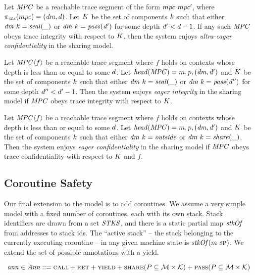 \documentclass[acmsmall,review,anonymous]{acmart}\settopmatter{printfolios=true,printccs=false,printacmref=false}
\begin{document}
 Let \(\mathit{MPC}\) be a reachable trace segment of the form
\(mpc ~ mpc'\), where \(\pi_{\mathit{ctx}}(mpc) = (\mathit{dm},d)\).
Let \(K\) be the set of components \(k\) such that either
\(\mathit{dm} ~ k = \mathit{seal(\_)}\) or \(\mathit{dm} ~ k = \mathit{pass(d')}\) for
some depth \(d' < d-1\). If any such \(\mathit{MPC}\) obeys trace integrity with respect
to \(K\), then the system enjoys {\em ultra-eager confidentiality} in the sharing
model.

 Let \(\mathit{MPC} \langle f \rangle\) be a reachable trace segment where \(f\) holds
on contexts whose depth is less than or equal to some \(d\). Let \(\mathit{head}(\mathit{MPC}) =
m,p,(\mathit{dm},d')\) and \(K\) be the set of components
\(k\) such that either \(\mathit{dm} ~ k = \mathit{seal(\_)}\) or
\(\mathit{dm} ~ k = \mathit{pass(d'')}\) for some depth \(d'' < d'-1\).
Then the system enjoys {\em eager integrity} in the sharing model if \(\mathit{MPC}\) obeys
trace integrity with respect to \(K\).

 Let \(\mathit{MPC} \langle f \rangle\) be a reachable trace segment where \(f\) holds
on contexts whose depth is less than or equal to some \(d\). Let \(\mathit{head}(\mathit{MPC}) =
m,p,(\mathit{dm},d')\) and \(K\) be the set of components
\(k\) such that either \(\mathit{dm} ~ k = \mathit{outside}\) or
\(\mathit{dm} ~ k = \mathit{share(\_)}\). Then the system enjoys {\em eager confidentiality}
in the sharing model if \(\mathit{MPC}\) obeys trace confidentiality with respect to \(K\)
and \(f\).

\subsection{Coroutine Safety}

Our final extension to the model is to add coroutines. We assume a very simple model with
a fixed number of coroutines, each with its own stack.
Stack identifiers are drawn from a set \(\mathit{STKS}\), and there is a static partial map
\(\mathit{stkOf}\) from addresses to stack ids. The ``active stack'' -- the stack belonging to the
currently executing coroutine -- in any given machine state is \(\mathit{stkOf}(m ~ \textsc{sp})\).
We extend the set of possible annotations with a yield.

\[\mathit{ann} \in \mathit{Ann} ::= \text{\sc call} + \text{\sc ret} + \text{\sc yield} +
\text{\sc share}(P \subseteq {\mathcal M} \times {\mathcal K}) +
\text{\sc pass}(P \subseteq {\mathcal M} \times {\mathcal K})\]
\end{document}
